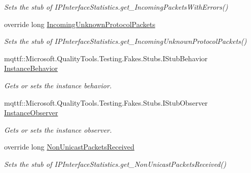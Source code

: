 \begin{DoxyCompactItemize}
\begin{DoxyCompactList}\small\item\em Sets the stub of I\-P\-Interface\-Statistics.\-get\-\_\-\-Incoming\-Packets\-With\-Errors()\end{DoxyCompactList}\item 
override long \hyperlink{class_system_1_1_net_1_1_network_information_1_1_fakes_1_1_stub_i_p_interface_statistics_af0accf24b6951cea5cc50bf6c7b370c7}{Incoming\-Unknown\-Protocol\-Packets}
\begin{DoxyCompactList}\small\item\em Sets the stub of I\-P\-Interface\-Statistics.\-get\-\_\-\-Incoming\-Unknown\-Protocol\-Packets()\end{DoxyCompactList}\item 
mqttf\-::\-Microsoft.\-Quality\-Tools.\-Testing.\-Fakes.\-Stubs.\-I\-Stub\-Behavior \hyperlink{class_system_1_1_net_1_1_network_information_1_1_fakes_1_1_stub_i_p_interface_statistics_a7eb72929e8ef6e3eb2112823ed7e4e82}{Instance\-Behavior}
\begin{DoxyCompactList}\small\item\em Gets or sets the instance behavior.\end{DoxyCompactList}\item 
mqttf\-::\-Microsoft.\-Quality\-Tools.\-Testing.\-Fakes.\-Stubs.\-I\-Stub\-Observer \hyperlink{class_system_1_1_net_1_1_network_information_1_1_fakes_1_1_stub_i_p_interface_statistics_a5d1953f2880610f14da02aa096a8dc2f}{Instance\-Observer}
\begin{DoxyCompactList}\small\item\em Gets or sets the instance observer.\end{DoxyCompactList}\item 
override long \hyperlink{class_system_1_1_net_1_1_network_information_1_1_fakes_1_1_stub_i_p_interface_statistics_a613ce178ed82cf6a3786acdd6d3de12a}{Non\-Unicast\-Packets\-Received}
\begin{DoxyCompactList}\small\item\em Sets the stub of I\-P\-Interface\-Statistics.\-get\-\_\-\-Non\-Unicast\-Packets\-Received()\end{DoxyCompactList}\item 

\end{DoxyCompactItemize}
